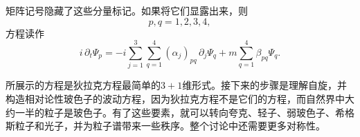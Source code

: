 \begin{classroomqa}
\end{classroomqa}

\begin{classroomqa}
\end{classroomqa}

\begin{classroomqa}
\end{classroomqa}

矩阵记号隐藏了这些分量标记。如果将它们显露出来，则
\begin{equation}
p,q=1,2,3,4,
\end{equation}
方程读作
\begin{equation}
i\,\partial_t\Psi_p
=
-i\sum_{j=1}^{3}\sum_{q=1}^{4}
(\alpha_j)_{pq}\,\partial_j\Psi_q
+m\sum_{q=1}^{4}\beta_{pq}\Psi_q.
\end{equation}

\begin{classroomqa}
\end{classroomqa}

所展示的方程是狄拉克方程最简单的\(3+1\)维形式。接下来的步骤是理解自旋，并构造相对论性玻色子的波动方程，因为狄拉克方程不是它们的方程，而自然界中大约一半的粒子是玻色子。有了这些要素，就可以转向夸克、轻子、弱玻色子、希格斯粒子和光子，并为粒子谱带来一些秩序。整个讨论中还需要更多对称性。
